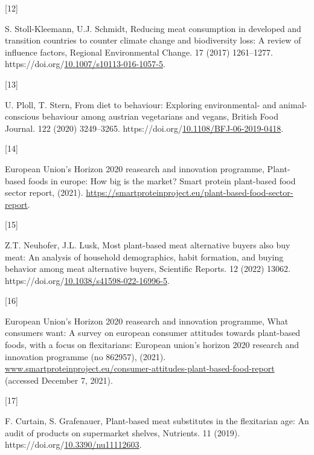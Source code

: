 \documentclass[preprint,3p,
a4paper]{elsarticle} %
\newlength{\cslhangindent}
\newlength{\csllabelwidth}
\newlength{\cslentryspacingunit} %
\newenvironment{CSLReferences}[2] %
 {%
  \setlength{\parindent}{0pt}
  \ifodd #1
  \let\oldpar\par
  \def\par{\hangindent=\cslhangindent\oldpar}
  \fi
  \setlength{\parskip}{#2\cslentryspacingunit}
 }%
 {}
\newcommand{\CSLLeftMargin}[1]{\parbox[t]{\csllabelwidth}{#1}}
\newcommand{\CSLRightInline}[1]{\parbox[t]{\linewidth - \csllabelwidth}{#1}\break}
\begin{document}
\begin{CSLReferences}{0}{0}
\leavevmode{}%
\CSLLeftMargin{{[}12{]} }%
\CSLRightInline{S. Stoll-Kleemann, U.J. Schmidt, Reducing meat
consumption in developed and transition countries to counter climate
change and biodiversity loss: A review of influence factors, Regional
Environmental Change. 17 (2017) 1261--1277.
https://doi.org/\href{https://doi.org/10.1007/s10113-016-1057-5}{10.1007/s10113-016-1057-5}.}

\leavevmode{}%
\CSLLeftMargin{{[}13{]} }%
\CSLRightInline{U. Ploll, T. Stern, From diet to behaviour: Exploring
environmental- and animal-conscious behaviour among austrian vegetarians
and vegans, British Food Journal. 122 (2020) 3249--3265.
https://doi.org/\href{https://doi.org/10.1108/BFJ-06-2019-0418}{10.1108/BFJ-06-2019-0418}.}

\leavevmode{}%
\CSLLeftMargin{{[}14{]} }%
\CSLRightInline{European Union's Horizon 2020 reasearch and innovation
programme, Plant-based foods in europe: How big is the market? Smart
protein plant-based food sector report, (2021).
\url{https://smartproteinproject.eu/plant-based-food-sector-report}.}

\leavevmode{}%
\CSLLeftMargin{{[}15{]} }%
\CSLRightInline{Z.T. Neuhofer, J.L. Lusk, Most plant-based meat
alternative buyers also buy meat: An analysis of household demographics,
habit formation, and buying behavior among meat alternative buyers,
Scientific Reports. 12 (2022) 13062.
https://doi.org/\href{https://doi.org/10.1038/s41598-022-16996-5}{10.1038/s41598-022-16996-5}.}

\leavevmode{}%
\CSLLeftMargin{{[}16{]} }%
\CSLRightInline{European Union's Horizon 2020 reasearch and innovation
programme, What consumers want: A survey on european consumer attitudes
towards plant-based foods, with a focus on flexitarians: European
union's horizon 2020 research and innovation programme (no 862957),
(2021).
\href{https://www.smartproteinproject.eu/consumer-attitudes-plant-based-food-report}{www.smartproteinproject.eu/consumer-attitudes-plant-based-food-report}
(accessed December 7, 2021).}

\leavevmode{}%
\CSLLeftMargin{{[}17{]} }%
\CSLRightInline{F. Curtain, S. Grafenauer, Plant-based meat substitutes
in the flexitarian age: An audit of products on supermarket shelves,
Nutrients. 11 (2019).
https://doi.org/\href{https://doi.org/10.3390/nu11112603}{10.3390/nu11112603}.}


\end{CSLReferences}
\end{document}
